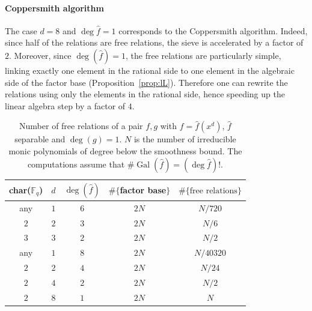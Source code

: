 \documentclass[a4wide]{article}
\newcommand{\F}{{\mathbb F}}
\DeclareMathOperator{\Gal}{Gal}
\theoremstyle{plain}
\theoremstyle{definition}
\theoremstyle{remark}
\begin{document}
\paragraph{Coppersmith algorithm}
The case $d=8$ and $\deg \hat{f}=1$
corresponds to the Coppersmith algorithm.
Indeed, since half of the relations are free relations, the sieve is
accelerated by a factor of $2$. Moreover, since $\deg(\hat{f})=1$, the free
relations are particularly simple, linking exactly one element in the
rational side to one element in the algebraic side of the factor base (Proposition~\ref{prop:lL}).
Therefore one can rewrite the relations using only the elements in the
rational side, hence speeding up the linear algebra step by a factor of $4$.


\begin{table}

	\caption{Number of free relations of a pair $f,g$ with
		$f=\hat{f}(x^d)$,
		$\hat{f}$ separable and $\deg(g)=1$. $N$ is the number of
		irreducible monic polynomials of degree below the smoothness bound. The computations assume
that $\#\Gal(\hat{f})=(\deg \hat{f})!$.}
\begin{center}
\begin{tabular}{|c|c|c|c|c|}
\hline
char($\F_q$)  & $d$ & $\deg(\hat{f})$ & $\#\{$factor base$\}$& $\#\{\text{free relations}\}$\\
\hline
any                            & $1$   &  $6$     & $2N$      & $N/720$    \\
\hline                                          
        $2$                     & $2$   &  $3$    &  $2N$      & $N/6$      \\
        \hline                                           
        $3$                     & $3$   &  $2$    &  $2N$      & $N/2$      \\  
           \hline                                        
	   \hline                                        
        any                     & $1$   &  $8$    &  $2N$     & $N/40320$   \\
        \hline                                       
        $2$                     & $2$   &  $4$    &  $2N$     & $N/24$      \\
        \hline                                           
	$2$                     & $4$   &  $2$    &  $2N$     & $N/2$       \\
        \hline                                         
	$2$                     & $8$   &  $1$    &  $2N$     & $N$         \\
\hline

\end{tabular}
\end{center}

	\label{freerelations}
\end{table}
\end{document}
